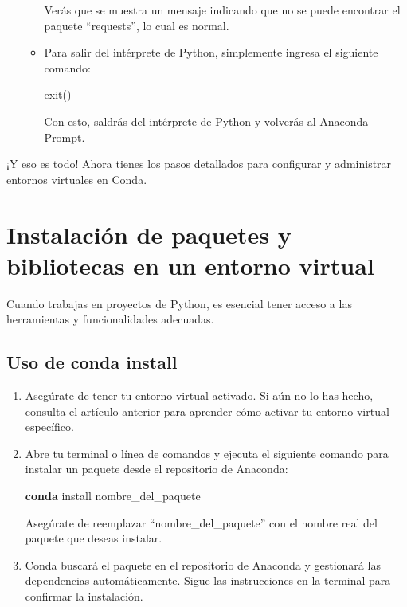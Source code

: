 \documentclass[
  a4paper,
]{article}
\newenvironment{Shaded}{}{}
\newcommand{\ExtensionTok}[1]{\textcolor[rgb]{0.84,0.23,0.29}{\textbf{#1}}}
\newcommand{\NormalTok}[1]{\textcolor[rgb]{0.14,0.16,0.18}{#1}}
\begin{document}
\begin{enumerate}
\begin{itemize}
    Verás que se muestra un mensaje indicando que no se puede encontrar
    el paquete ``requests'', lo cual es normal.
  \item
    Para salir del intérprete de Python, simplemente ingresa el
    siguiente comando:

\begin{Shaded}
\begin{Highlighting}[]
\NormalTok{exit()}
\end{Highlighting}
\end{Shaded}

    Con esto, saldrás del intérprete de Python y volverás al Anaconda
    Prompt.
  \end{itemize}
\end{enumerate}

¡Y eso es todo! Ahora tienes los pasos detallados para configurar y
administrar entornos virtuales en Conda.

\hypertarget{instalaciuxf3n-de-paquetes-y-bibliotecas-en-un-entorno-virtual}{%
\section{Instalación de paquetes y bibliotecas en un entorno
virtual}\label{instalaciuxf3n-de-paquetes-y-bibliotecas-en-un-entorno-virtual}}

Cuando trabajas en proyectos de Python, es esencial tener acceso a las
herramientas y funcionalidades adecuadas.

\hypertarget{uso-de-conda-install}{%
\subsection{Uso de conda install}\label{uso-de-conda-install}}

\begin{enumerate}
\def\labelenumi{\arabic{enumi}.}
\item
  Asegúrate de tener tu entorno virtual activado. Si aún no lo has
  hecho, consulta el artículo anterior para aprender cómo activar tu
  entorno virtual específico.
\item
  Abre tu terminal o línea de comandos y ejecuta el siguiente comando
  para instalar un paquete desde el repositorio de Anaconda:

\begin{Shaded}
\begin{Highlighting}[]
\ExtensionTok{conda}\NormalTok{ install nombre\_del\_paquete}
\end{Highlighting}
\end{Shaded}

  Asegúrate de reemplazar ``nombre\_del\_paquete'' con el nombre real
  del paquete que deseas instalar.
\item
  Conda buscará el paquete en el repositorio de Anaconda y gestionará
  las dependencias automáticamente. Sigue las instrucciones en la
  terminal para confirmar la instalación.
\end{enumerate}
\end{document}
